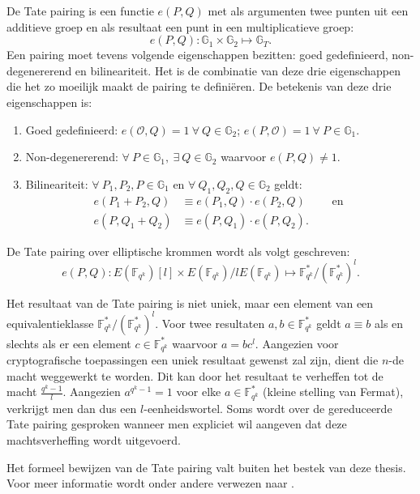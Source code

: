 De Tate pairing is een functie $e(P, Q)$ met als argumenten twee punten uit een additieve groep en als resultaat een punt in een multiplicatieve groep:
\[e(P, Q): \mathbb{G}_1 \times \mathbb{G}_2 \mapsto \mathbb{G}_T.\]
Een pairing moet tevens volgende eigenschappen bezitten: goed gedefinieerd, non-degenererend en bilineariteit. Het is de combinatie van deze drie eigenschappen die het zo moeilijk maakt de pairing te defini\"eren. De betekenis van deze drie eigenschappen is:
\begin{enumerate}
	\item Goed gedefinieerd: $e(\mathcal{O}, Q) = 1 \: \forall \: Q \in \mathbb{G}_2$; $e(P, \mathcal{O}) = 1 \: \forall \: P \in \mathbb{G}_1$.
	
	\item Non-degenererend: $\forall \: P \in \mathbb{G}_1, \: \exists \: Q \in \mathbb{G}_2$ waarvoor $e(P, Q) \neq 1$.
	
	\item Bilineariteit: $\forall \: P_1, P_2, P \in \mathbb{G}_1$ en $\forall \: Q_1, Q_2, Q \in \mathbb{G}_2$ geldt:
		\[\begin{aligned}
			e(P_1 + P_2, Q) &\equiv e(P_1, Q) \cdot e(P_2, Q) \qquad \text{ en }\\
			e(P, Q_1 + Q_2) &\equiv e(P, Q_1) \cdot e(P, Q_2).
		\end{aligned}\]
\end{enumerate}

De Tate pairing over elliptische krommen wordt als volgt geschreven:
\[e(P, Q): E(\mathbb{F}_{q^k})[l] \times E(\mathbb{F}_{q^k})/l E(\mathbb{F}_{q^k}) \mapsto \mathbb{F}_{q^k}^* / (\mathbb{F}_{q^k}^*)^l.\]

Het resultaat van de Tate pairing is niet uniek, maar een element van een equivalentieklasse $\mathbb{F}_{q^k}^* / (\mathbb{F}_{q^k}^*)^l$. Voor twee resultaten $a, b \in \mathbb{F}_{q^k}^*$ geldt $a \equiv b$ als en slechts als er een element $c \in \mathbb{F}_{q^k}^*$ waarvoor $a = bc^l$. Aangezien voor cryptografische toepassingen een uniek resultaat gewenst zal zijn, dient die $n$-de macht weggewerkt te worden. Dit kan door het resultaat te verheffen tot de macht $\frac{q^k - 1 }{l}$. Aangezien $a^{q^k - 1} = 1$ voor elke $a \in \mathbb{F}_{q^k}^*$ (kleine stelling van Fermat), verkrijgt men dan dus een $l$-eenheidswortel. Soms wordt over de gereduceerde Tate pairing gesproken wanneer men expliciet wil aangeven dat deze machtsverheffing wordt uitgevoerd.

Het formeel bewijzen van de Tate pairing valt buiten het bestek van deze thesis. Voor meer informatie wordt onder andere verwezen naar \cite{maas, ruck, hess}.

